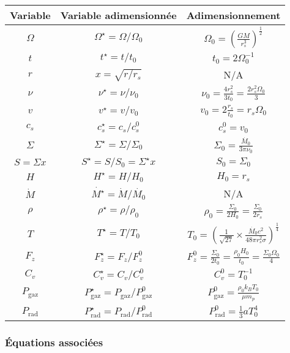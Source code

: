 \begin{center}
    \begin{tabular}{|c|c|c|}
        \hline
        Variable & Variable adimensionnée & Adimensionnement \\
        \hline
        $\Omega$ & $\Omega^\star = \Omega/\Omega_0$ & $\Omega_0 = \left( \frac{G M}{r^3_s} \right)^\frac{1}{2}$ \\
        $t$ & $t^\star = t/t_0$ & $t_0 = 2 \Omega_0^{-1}$ \\
        $r$ & $x = \sqrt{r/r_s}$ & N/A \\
        $\nu$ & $\nu^\star = \nu/\nu_0$ & $\nu_0 = \frac{4 r_s^2}{3 t_0} = \frac{2 r_s^2 \Omega_0}{3}$ \\
        $v$ & $v^\star = v/v_0$ & $v_0 = 2 \frac{r_s}{t_0} = r_s \Omega_0$ \\
        $c_s$ & $c_s^\star = c_s/c_s^0$ & $c_s^0 = v_0$ \\
        $\Sigma$ & $\Sigma^\star = \Sigma/\Sigma_0$ & $\Sigma_0 = \frac{\dot{M_0}}{3 \pi \nu_0}$ \\
        $S = \Sigma x$ & $S^\star = S/S_0 = \Sigma^\star x$ & $S_0 = \Sigma_0$ \\
        $H$ & $H^\star = H/H_0$ & $H_0 = r_s$ \\
        $\dot{M}$ & $\dot{M^\star} = \dot{M}/\dot{M_0}$ & N/A \\
        $\rho$ & $\rho^\star = \rho/\rho_0$ & $\rho_0 = \frac{\Sigma_0}{2 H_0} = \frac{\Sigma_0}{2 r_s}$ \\
        $T$ & $T^\star = T/T_0$ & $T_0 = \left(\frac{1}{\sqrt{27}} \times \frac{\dot{M_0} c^2}{48 \pi r_s^2 \sigma} \right)^\frac{1}{4}$ \\
        $F_z$ & $F_z^\star = F_z/F_z^0$ & $F_z^0 = \frac{\Sigma_0}{2 t_0} = \frac{\rho_0 H_0}{t_0} = \frac{\Sigma_0 \Omega_0}{4}$ \\
        $C_v$ & $C_v^\star = C_v/C_v^0$ & $C_v^0 = T_0^{-1}$ \\
        $P_\mathrm{gaz}$ & $P_\mathrm{gaz}^\star = P_\mathrm{gaz}/P_\mathrm{gaz}^0$ & $P_\mathrm{gaz}^0 = \frac{\rho_0 k_B T_0}{\mu m_p}$ \\
        $P_\mathrm{rad}$ & $P_\mathrm{rad}^\star = P_\mathrm{rad}/P_\mathrm{rad}^0$ & $P_\mathrm{rad}^0 = \frac{1}{3} a T_0^4$ \\
        \hline
    \end{tabular}
\end{center}

\subsubsection{Équations associées}

